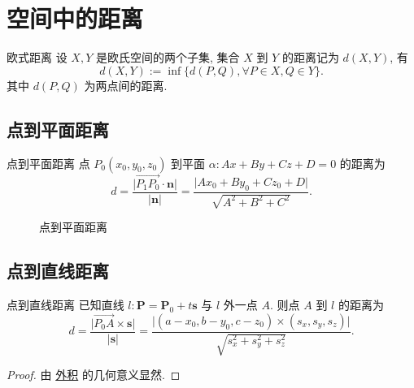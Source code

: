 \documentclass[cn,toc=twocol]{elegantbook}
\newcommand{\ve}[1]{\boldsymbol{#1}}
\newcommand{\Ve}[1]{\overrightarrow{#1}}
\newcommand{\FIGS}{
	\begin{figure}[H]
	\centering
}
\newcommand{\FIGE}{
	\end{figure}
}
\begin{document}
\section{空间中的距离}

\begin{definition}{欧式距离}
	设 $X,Y$ 是欧氏空间的两个子集, 集合 $X$ 到 $Y$ 的距离记为 $d(X,Y)$, 有
	\[
		d(X, Y) := \inf \{d(P,Q),\forall P \in X, Q \in Y\}.
	\] 
	其中 $d(P,Q)$ 为两点间的距离.
\end{definition}

\subsection{点到平面距离}

\begin{theorem}{点到平面距离}
	点 $P_0 (x_0, y_0, z_0)$ 到平面 $\alpha: Ax + By + Cz + D = 0$ 的距离为
	\[
		d = \frac{\lvert \Ve{P_1P_0} \cdot \ve n \rvert}{\lvert \ve n \rvert} = \frac{\lvert Ax_0 + By_0 + Cz_0 + D \rvert}{\sqrt{A^2 + B^2 + C^2}}.
	\]
\end{theorem}

\FIGS
{}
\caption{点到平面距离}
\FIGE

\subsection{点到直线距离}

\begin{theorem}{点到直线距离}
	已知直线 $l: \ve P = \ve P_0 + t \ve s$ 与 $l$ 外一点 $A$. 则点 $A$ 到 $l$ 的距离为
	\[
		d = \frac{\lvert\Ve{P_0 A} \times \ve s\rvert}{\lvert\ve s\rvert} = \frac{\lvert (a - x_0, b - y_0, c - z_0) \times (s_x, s_y, s_z) \rvert}{\sqrt{s_x^2 + s_y^2 + s_z^2}}.
	\]
\end{theorem}
\begin{proof}
	由 \hyperref[def:vproduct]{外积} 的几何意义显然.
\end{proof}
\end{document}
